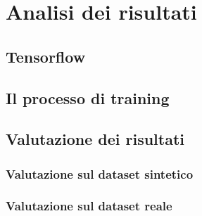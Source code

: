 \chapter{Analisi dei risultati}

\section{Tensorflow}

\section{Il processo di training}

\section{Valutazione dei risultati}

\subsection{Valutazione sul dataset sintetico}

\subsection{Valutazione sul dataset reale}